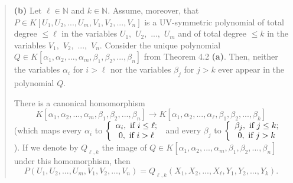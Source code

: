 \documentclass[numbers=enddot,12pt,final,onecolumn,notitlepage]{scrartcl}%
\begin{document}
\begin{quote}
\textbf{(b)} Let $\ell\in\mathbb{N}$ and $k\in\mathbb{N}$. Assume, moreover,
that $P\in K\left[  U_{1},U_{2},...,U_{m},V_{1},V_{2},...,V_{n}\right]  $ is a
UV-symmetric polynomial of total degree $\leq\ell$ in the variables $U_{1},$
$U_{2},$ $...,$ $U_{m}$ and of total degree $\leq k$ in the variables $V_{1},$
$V_{2},$ $...,$ $V_{n}.$ Consider the unique polynomial $Q\in K\left[
\alpha_{1},\alpha_{2},...,\alpha_{m},\beta_{1},\beta_{2},...,\beta_{n}\right]
$ from Theorem 4.2 \textbf{(a)}. Then, neither the variables $\alpha_{i}$ for
$i>\ell$ nor the variables $\beta_{j}$ for $j>k$ ever appear in the polynomial
$Q$.

There is a canonical homomorphism%
\[
K\left[  \alpha_{1},\alpha_{2},...,\alpha_{m},\beta_{1},\beta_{2}%
,...,\beta_{n}\right]  \rightarrow K\left[  \alpha_{1},\alpha_{2}%
,...,\alpha_{\ell},\beta_{1},\beta_{2},...,\beta_{k}\right]
\]
(which maps every $\alpha_{i}$ to $\left\{
\begin{array}
[c]{c}%
\alpha_{i},\text{ if }i\leq\ell;\\
0,\text{ if }i>\ell
\end{array}
\right.  $ and every $\beta_{j}$ to $\left\{
\begin{array}
[c]{c}%
\beta_{j},\text{ if }j\leq k;\\
0,\text{ if }j>k
\end{array}
\right.  $). If we denote by $Q_{\ell,k}$ the image of $Q\in K\left[
\alpha_{1},\alpha_{2},...,\alpha_{m},\beta_{1},\beta_{2},...,\beta_{n}\right]
$ under this homomorphism, then%
\[
P\left(  U_{1},U_{2},...,U_{m},V_{1},V_{2},...,V_{n}\right)  =Q_{\ell
,k}\left(  X_{1},X_{2},...,X_{\ell},Y_{1},Y_{2},...,Y_{k}\right)  .
\]



\end{quote}
\end{document}
